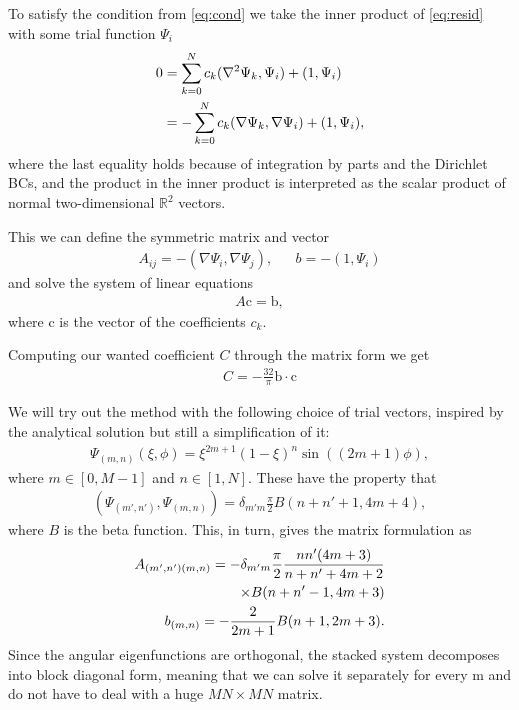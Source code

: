 \documentclass[10pt,a4paper,twocolumn]{article}
\renewcommand{\vec}[1]{\bm{\mathrm{#1}}}
\begin{document}
To satisfy the condition from \cref{eq:cond} we take the inner product of \cref{eq:resid} with some trial function $\Psi_i$
%
\begin{align}
    0 &= \sum_{k=0}^{N} c_k (\nabla^2 \Psi_k, \Psi_i) + (1, \Psi_i) \notag\\ &= -\sum_{k=0}^{N} c_k (\nabla \Psi_k, \nabla \Psi_i) + (1, \Psi_i),
\end{align}
%
where the last equality holds because of integration by parts and the Dirichlet BCs, and the product in the inner product is interpreted as the scalar product of normal two-dimensional $\mathbb{R}^2$ vectors.

This we can define the symmetric matrix and vector
%
\begin{align}
    &A_{ij} = - (\nabla \Psi_i, \nabla \Psi_j),& &b = - (1, \Psi_i)&
\end{align}
%
and solve the system of linear equations
%
\begin{align}
    A \vec{c} = \vec{b},
\end{align}
%
where $\vec{c}$ is the vector of the coefficients $c_k$.

Computing our wanted coefficient $C$ through the matrix form we get
%
\begin{align}
    C = -\frac{32}{\pi} \vec{b} \cdot \vec{c}
\end{align}

We will try out the method with the following choice of trial vectors, inspired by the analytical solution but still a simplification of it:
%
\begin{align}
    \Psi_{(m,n)}(\xi, \phi) = \xi^{2 m + 1} (1 - \xi)^{n} \sin((2 m + 1) \phi),
\end{align}
%
where $m \in [0, M - 1]$ and $n \in [1, N]$. These have the property that
%
\begin{align}
    (\Psi_{(m', n')}, \Psi_{(m, n)}) = \delta_{m' m} \frac{\pi}{2} B(n + n' + 1, 4 m + 4),
\end{align}
%
where $B$ is the beta function. This, in turn, gives the matrix formulation as
%
\begin{align}
    A_{(m', n')(m, n)} = -\delta_{m' m} \frac{\pi}{2} \frac{n n' (4 m + 3)}{n + n' + 4 m + 2} \notag\\ \times B(n + n' - 1, 4 m + 3) \\
    b_{(m, n)} = - \frac{2}{2 m + 1} B(n + 1, 2 m + 3).
\end{align}
%
Since the angular eigenfunctions are orthogonal, the stacked system decomposes into block diagonal form, meaning that we can solve it separately for every m and do not have to deal with a huge $M N \times M N$ matrix.
\end{document}
